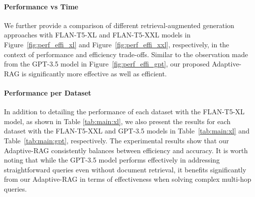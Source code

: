 





\paragraph{Performance vs Time}
We further provide a comparison of different retrieval-augmented generation approaches with FLAN-T5-XL and FLAN-T5-XXL models in Figure~\ref{fig:perf_effi_xl} and Figure~\ref{fig:perf_effi_xxl}, respectively, in the context of performance and efficiency trade-offs. Similar to the observation made from the GPT-3.5 model in Figure~\ref{fig:perf_effi_gpt}, our proposed Adaptive-RAG is significantly more effective as well as efficient.

\paragraph{Performance per Dataset}
In addition to detailing the performance of each dataset with the FLAN-T5-XL model, as shown in Table \ref{tab:main:xl}, we also present the results for each dataset with the FLAN-T5-XXL and GPT-3.5 models in Table~\ref{tab:main:xl} and Table~\ref{tab:main:gpt}, respectively. The experimental results show that our Adaptive-RAG consistently balances between efficiency and accuracy. It is worth noting that while the GPT-3.5 model performs effectively in addressing straightforward queries even without document retrieval, it benefits significantly from our Adaptive-RAG in terms of effectiveness when solving complex multi-hop queries.



